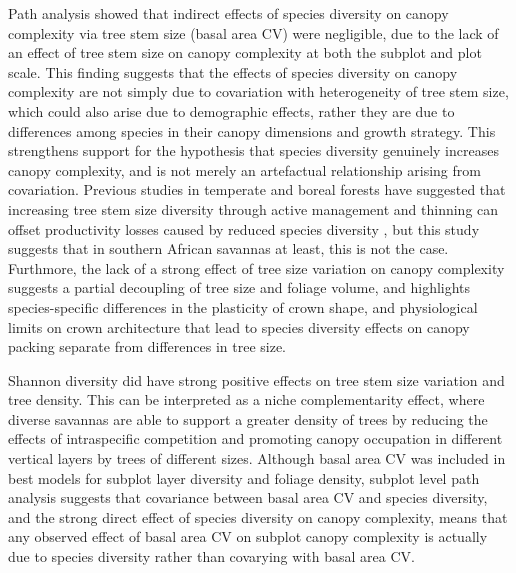 \documentclass[11pt,a4paper]{article}
\begin{document}
Path analysis showed that indirect effects of species diversity on canopy complexity via tree stem size (basal area CV) were negligible, due to the lack of an effect of tree stem size on canopy complexity at both the subplot and plot scale. This finding suggests that the effects of species diversity on canopy complexity are not simply due to covariation with heterogeneity of tree stem size, which could also arise due to demographic effects, rather they are due to differences among species in their canopy dimensions and growth strategy. This strengthens support for the hypothesis that species diversity genuinely increases canopy complexity, and is not merely an artefactual relationship arising from covariation. Previous studies in temperate and boreal forests have suggested that increasing tree stem size diversity through active management and thinning can offset productivity losses caused by reduced species diversity \citep{Levick2009}, but this study suggests that in southern African savannas at least, this is not the case. Furthmore, the lack of a strong effect of tree size variation on canopy complexity suggests a partial decoupling of tree size and foliage volume, and highlights species-specific differences in the plasticity of crown shape, and physiological limits on crown architecture that lead to species diversity effects on canopy packing separate from differences in tree size.

Shannon diversity did have strong positive effects on tree stem size variation and tree density. This can be interpreted as a niche complementarity effect, where diverse savannas are able to support a greater density of trees by reducing the effects of intraspecific competition and promoting canopy occupation in different vertical layers by trees of different sizes. Although basal area CV was included in best models for subplot layer diversity and foliage density, subplot level path analysis suggests that covariance between basal area CV and species diversity, and the strong direct effect of species diversity on canopy complexity, means that any observed effect of basal area CV on subplot canopy complexity is actually due to species diversity rather than covarying with basal area CV. 
\end{document}

